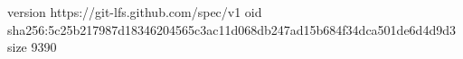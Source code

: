 version https://git-lfs.github.com/spec/v1
oid sha256:5c25b217987d18346204565c3ac11d068db247ad15b684f34dca501de6d4d9d3
size 9390
